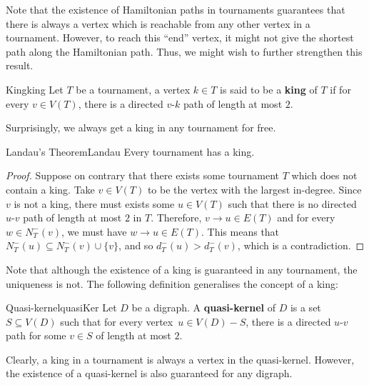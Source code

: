 \documentclass[math]{amznotes}
\theoremstyle{remark}
\newcommand{\0}{\mathbf{0}}
\newcommand{\1}{\mathbf{1}}
\begin{document}
Note that the existence of Hamiltonian paths in tournaments guarantees that there is always a vertex which is reachable from any other vertex in a tournament. However, to reach this ``end'' vertex, it might not give the shortest path along the Hamiltonian path. Thus, we might wish to further strengthen this result.
\begin{dfnbox}{King}{king}
    Let $T$ be a tournament, a vertex $k \in T$ is said to be a {\color{red} \textbf{king}} of $T$ if for every $v \in V(T)$, there is a directed $v$-$k$ path of length at most $2$.
\end{dfnbox}
Surprisingly, we always get a king in any tournament for free.
\begin{thmbox}{Landau's Theorem}{Landau}
    Every tournament has a king.
    \tcblower
    \begin{proof}
        Suppose on contrary that there exists some tournament $T$ which does not contain a king. Take $v \in V(T)$ to be the vertex with the largest in-degree. Since $v$ is not a king, there must exists some $u \in V(T)$ such that there is no directed $u$-$v$ path of length at most $2$ in $T$. Therefore, $v \to u \in E(T)$ and for every $w \in N_T^-(v)$, we must have $w \to u \in E(T)$. This means that $N_T^-(u) \subseteq N_T^-(v) \cup \{v \}$, and so $d_T^-(u) > d_T^-(v)$, which is a contradiction.
    \end{proof}
\end{thmbox}
Note that although the existence of a king is guaranteed in any tournament, the uniqueness is not. The following definition generalises the concept of a king:
\begin{dfnbox}{Quasi-kernel}{quasiKer}
    Let $D$ be a digraph. A {\color{red} \textbf{quasi-kernel}} of $D$ is a set $S \subseteq V(D)$ such that for every vertex~$u \in V(D) - S$, there is a directed $u$-$v$ path for some $v \in S$ of length at most $2$.
\end{dfnbox}
Clearly, a king in a tournament is always a vertex in the quasi-kernel. However, the existence of a quasi-kernel is also guaranteed for any digraph.
\end{document}
